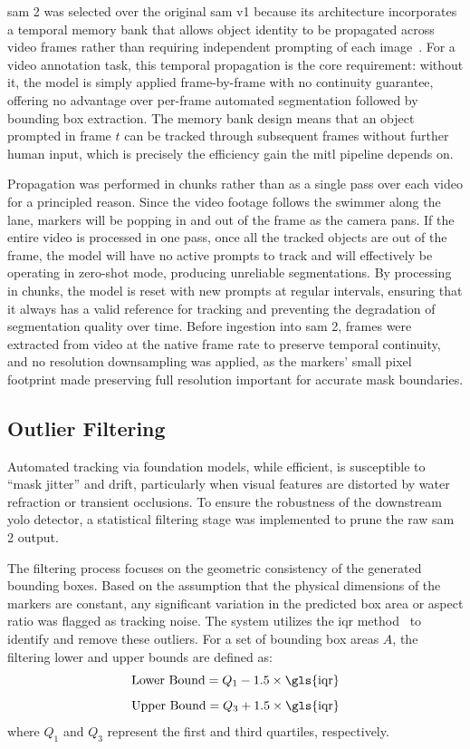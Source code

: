 \gls{sam} 2 was selected over the original \gls{sam} v1 because its architecture incorporates a temporal
memory bank that allows object identity to be propagated across video frames rather than
requiring independent prompting of each image~\cite{ravi2024sam}. For a video annotation
task, this temporal propagation is the core requirement: without it, the model is simply
applied frame-by-frame with no continuity guarantee, offering no advantage over per-frame
automated segmentation followed by bounding box extraction. The memory bank design means that
an object prompted in frame $t$ can be tracked through subsequent frames without further
human input, which is precisely the efficiency gain the \gls{mitl} pipeline depends on.

Propagation was performed in chunks rather than as a single pass over each video for a
principled reason. Since the video footage follows the swimmer along the lane, markers will be popping in and out of the frame as the camera pans. If the entire video is processed in one pass, once all the tracked objects are out of the frame, the model will have no active prompts to track and will effectively be operating in zero-shot mode, producing unreliable segmentations. By processing in chunks, the model is reset with new prompts at regular intervals, ensuring that it always has a valid reference for tracking and preventing the degradation of segmentation quality over time. Before ingestion into \gls{sam} 2, frames were extracted
from video at the native frame rate to preserve temporal continuity, and no resolution
downsampling was applied, as the markers' small pixel footprint made preserving full resolution
important for accurate mask boundaries.

\subsection{Outlier Filtering}

Automated tracking via foundation models, while efficient, is susceptible to ``mask jitter''
and drift, particularly when visual features are distorted by water refraction or transient
occlusions. To ensure the robustness of the downstream \gls{yolo} detector, a statistical filtering
stage was implemented to prune the raw \gls{sam} 2 output.

The filtering process focuses on the geometric consistency of the generated bounding boxes.
Based on the assumption that the physical dimensions of the markers are constant, any
significant variation in the predicted box area or aspect ratio was flagged as tracking noise.
The system utilizes the \gls{iqr} method~\cite{tukey1977exploratory} to
identify and remove these outliers. For a set of bounding box areas $A$, the filtering lower and upper bounds are defined as:
\begin{equation}
    \text{Lower Bound} = Q_1 - 1.5 \times \text{\gls{iqr}}
\end{equation}
\begin{equation}
    \text{Upper Bound} = Q_3 + 1.5 \times \text{\gls{iqr}}
\end{equation}
where $Q_1$ and $Q_3$ represent the first and third quartiles, respectively.

